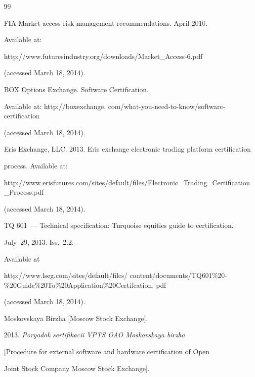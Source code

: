 {{\begin{thebibliography}{99}


FIA Market access risk management recommendations. April 2010.


Available at: {\sf


http://www.futuresindustry.org/downloads/Market\_Access-6.pdf}


(accessed March 18, 2014).










BOX Options Exchange. Software Certification.


Available at: {\sf http://boxexchange. com/what-you-need-to-know/software-certification}


(accessed March 18, 2014).







Eris Exchange, LLC. 2013. Eris exchange electronic trading platform certification


process. Available at:


{\sf http://www.erisfutures.com/sites/default/files/Electronic\_\linebreak Trading\_Certification\_Process.pdf}


 (accessed March 18, 2014).







TQ 601~--- Technical specification: Turquoise equities guide to certification.


July~29, 2013. Iss.~2.2.


Available at


{\sf http://www.lseg.com/sites/default/files/ content/documents/TQ601\%20-\%20Guide\%20To\%20Application\%20Certifcation. pdf}


(accessed March 18, 2014).







Moskovskaya Birzha [Moscow Stock Exchange].


2013. \textit{Poryadok sertifikacii VPTS OAO Moskovskaya birzha}


[Procedure for external software and hardware certification of Open


Joint Stock Company Moscow Stock Exchange].



\end{thebibliography}}}
